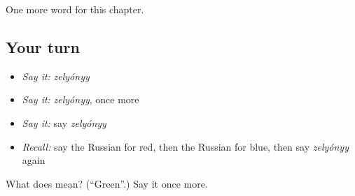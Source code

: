 \begin{grammarlens}[title={What you've built}]
One more word for this chapter.
\end{grammarlens}

\subsection*{Your turn}
\begin{itemize}
\raggedright
  \item \emph{Say it:} \emph{zelyónyy}
  \item \emph{Say it:} \emph{zelyónyy}, once more
  \item \emph{Say it:} say \emph{zelyónyy}
  \item \emph{Recall:} say the Russian for red, then the Russian for blue, then say \emph{zelyónyy} again
\end{itemize}

\begin{tcolorbox}[breakable,colback=teal!4,colframe=teal!35!black,title={Before you move on}]
What does  mean? (\textquotedblleft{}Green\textquotedblright{}.) Say it once more.
\end{tcolorbox}
